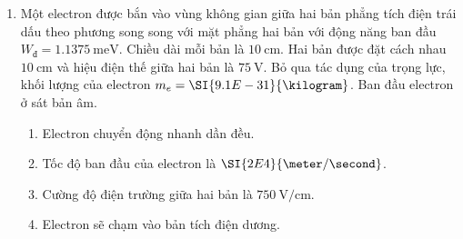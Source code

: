 \begin{enumerate}[label=\bfseries Câu \arabic*:]
\item Một electron được bắn vào vùng không gian giữa hai bản phẳng tích điện trái dấu theo phương song song với mặt phẳng hai bản với động năng ban đầu $W_\text{đ}=\SI{1.1375}{\milli\electronvolt}$. Chiều dài mỗi bản là $\SI{10}{\centi\meter}$. Hai bản được đặt cách nhau $\SI{10}{\centi\meter}$ và hiệu điện thế giữa hai bản là $\SI{75}{\volt}$. Bỏ qua tác dụng của trọng lực, khối lượng của electron $m_e=\SI{9.1E-31}{\kilogram}$. Ban đầu electron ở sát bản âm.
\begin{enumerate}[label=\bfseries \alph*)]
	\item Electron chuyển động nhanh dần đều.
	\item Tốc độ ban đầu của electron là $\SI{2E4}{\meter/\second}$.
	\item Cường độ điện trường giữa hai bản là $\SI{750}{\volt/\centi\meter}$.
	\item Electron sẽ chạm vào bản tích điện dương.
\end{enumerate}
\end{enumerate}
